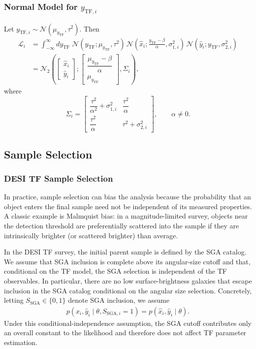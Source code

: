 \subsubsection{Normal Model for $y_{\text{TF},i}$}
Let $y_{\text{TF},i}\sim\mathcal{N}(\mu_{y_\mathrm{TF}},\tau^2)$.
Then
\begin{align}
\mathcal L_i
&=
\int_{-\infty}^{\infty} dy_{\text{TF}}\;
\mathcal N\!\left(y_{\text{TF}};\mu_{y_\mathrm{TF}},\tau^2\right)\,
\mathcal N\!\left(\hat x_i;\frac{y_{\text{TF}}-\beta}{\alpha},\sigma^2_{1,i}\right)\,
\mathcal N\!\left(\hat y_i;y_{\text{TF}},\sigma^2_{2,i}\right)\\
&=
\mathcal N_2\!\left(
\begin{bmatrix}\hat x_i\\ \hat y_i\end{bmatrix};
\begin{bmatrix}\dfrac{\mu_{y_\mathrm{TF}}-\beta}{\alpha}\\[4pt] \mu_{y_\mathrm{TF}}\end{bmatrix},
\Sigma_i
\right),
\end{align}
where
\begin{equation}
\Sigma_i
=
\begin{bmatrix}
\dfrac{\tau^{2}}{\alpha^{2}}+\sigma_{1,i}^{2} & \dfrac{\tau^{2}}{\alpha}\\[6pt]
\dfrac{\tau^{2}}{\alpha} & \tau^{2}+\sigma_{2,i}^{2}
\end{bmatrix},
\qquad \alpha\neq 0.
\end{equation}

\subsection{Sample Selection}
\label{sec:app1:selection}

\subsubsection{DESI TF Sample Selection}
In practice, sample selection can bias the analysis because the probability that an object enters the final
sample need not be independent of its measured properties.
A classic example is Malmquist bias: in a magnitude-limited survey, objects near the detection threshold are
preferentially scattered into the sample if they are intrinsically brighter (or scattered brighter) than average.

In the DESI TF survey, the initial parent sample is defined by the SGA catalog.
We assume that SGA inclusion is complete above its angular-size cutoff and that, conditional on the TF model,
the SGA selection is independent of the TF observables. In particular, there are no low surface-brightness galaxies that escape
inclusion in the SGA catalog conditional on the angular size selection.
Concretely, letting $S_{\text{SGA}}\in\{0,1\}$ denote SGA inclusion, we assume
\begin{align}
p(\hat x_i,\hat y_i \mid \theta, S_{\text{SGA},i}=1) = p(\hat x_i,\hat y_i \mid \theta).
\end{align}
Under this conditional-independence assumption, the SGA cutoff contributes only an
overall constant to the likelihood and therefore does not affect TF parameter estimation.

